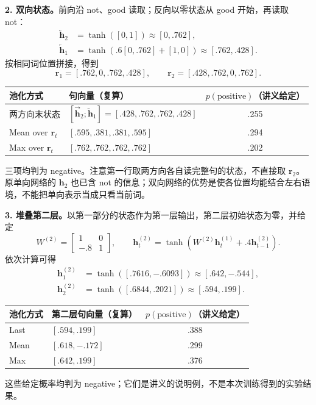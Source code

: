 \textbf{2. 双向状态。}前向沿 not、good 读取；反向以零状态从 good 开始，再读取 not：
\begin{align*}
 \overleftarrow{\mathbf h}_2&=\tanh([0,1])\approx[0,.762],\\
 \overleftarrow{\mathbf h}_1&=\tanh(.6[0,.762]+[1,0])\approx[.762,.428].
\end{align*}
按相同词位置拼接，得到
\[
 \mathbf r_1=[.762,0,.762,.428],\qquad
 \mathbf r_2=[.428,.762,0,.762].
\]
\begin{center}
\small
\begin{tabular}{@{}l l c@{}}
\toprule
池化方式 & 句向量（复算） & $p(\mathrm{positive})$（讲义给定） \\
\midrule
两方向末状态 & $[\overrightarrow{\mathbf h}_2;\overleftarrow{\mathbf h}_1]=[.428,.762,.762,.428]$ & .255 \\
Mean over $\mathbf r_t$ & $[.595,.381,.381,.595]$ & .294 \\
Max over $\mathbf r_t$ & $[.762,.762,.762,.762]$ & .202 \\
\bottomrule
\end{tabular}
\end{center}
三项均判为 negative。注意第一行取两方向各自读完整句的状态，不直接取 $\mathbf r_2$。原单向网络的 $\mathbf h_2$ 也已含 not 的信息；双向网络的优势是使各位置均能结合左右语境，不能把单向表示当成只看当前词。

\textbf{3. 堆叠第二层。}以第一部分的状态作为第一层输出，第二层初始状态为零，并给定
\[
 W^{(2)}=\begin{bmatrix}1&0\\-.8&1\end{bmatrix},\qquad
 \mathbf h_t^{(2)}=\tanh\!\left(W^{(2)}\mathbf h_t^{(1)}+.4\mathbf h_{t-1}^{(2)}\right).
\]
依次计算可得
\begin{align*}
 \mathbf h_1^{(2)}&=\tanh([.7616,-.6093])\approx[.642,-.544],\\
 \mathbf h_2^{(2)}&=\tanh([.6844,.2021])\approx[.594,.199].
\end{align*}
\begin{center}
\small
\begin{tabular}{@{}l l c@{}}
\toprule
池化方式 & 第二层句向量（复算） & $p(\mathrm{positive})$（讲义给定） \\
\midrule
Last & $[.594,.199]$ & .388 \\
Mean & $[.618,-.172]$ & .299 \\
Max & $[.642,.199]$ & .376 \\
\bottomrule
\end{tabular}
\end{center}
这些给定概率均判为 negative；它们是讲义的说明例，不是本次训练得到的实验结果。

